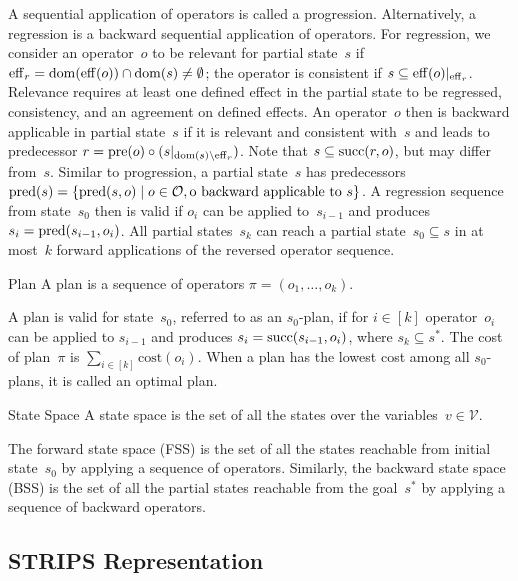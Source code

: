A sequential application of operators is called a progression. Alternatively, a regression is a backward sequential application of operators. For regression, we consider an operator~$o$ to be relevant for partial state~$s$ if $\operatorname{eff}_r=\operatorname{dom}(\operatorname{eff}(o))\cap\operatorname{dom}(s)\neq\emptyset$; the operator is consistent if $s \subseteq \operatorname{eff}(o)|_{\operatorname{eff}_r}$. Relevance requires at least one defined effect in the partial state to be regressed, consistency, and an agreement on defined effects. An operator~$o$ then is backward applicable in partial state~$s$ if it is relevant and consistent with~$s$ and leads to predecessor $r=\operatorname{pre}(o)\circ (s|_{\operatorname{dom}(s)\setminus\operatorname{eff}_r})$. Note that $s \subseteq \operatorname{succ}(r,o)$, but may differ from~$s$. Similar to progression, a partial state~$s$ has predecessors $\operatorname{pred}(s)=\{\operatorname{pred}(s,o)\mid o\in \mathcal{O}, \text{o backward applicable to }s\}$. A regression sequence from state~$s_0$ then is valid if $o_i$ can be applied to~$s_{i-1}$ and produces~$s_i=\operatorname{pred}(s_{i-1},o_i)$. All partial states~$s_k$ can reach a partial state~$s_0 \subseteq s$ in at most~$k$ forward applications of the reversed operator sequence.

\begin{definition}{Plan}
    \label{def:plan}
    A plan is a sequence of operators $\pi=(o_1,\ldots,o_k)$.
\end{definition}

A plan is valid for state~$s_0$, referred to as an $s_0$-plan, if for $i\in[k]$ operator~$o_i$ can be applied to $s_{i-1}$ and produces $s_i=\operatorname{succ}(s_{i-1},o_i)$, where $s_k \subseteq s^*$. The cost of plan~$\pi$ is $\sum_{i\in[k]} \text{cost}(o_i)$. When a plan has the lowest cost among all $s_0$-plans, it is called an optimal plan.

\begin{definition}{State Space}
    \label{def:statespace}
    A state space is the set of all the states over the variables~$v \in \mathcal{V}$.
\end{definition}

The forward state space (FSS) is the set of all the states reachable from initial state~$s_0$ by applying a sequence of operators. Similarly, the backward state space (BSS) is the set of all the partial states reachable from the goal~$s^*$ by applying a sequence of backward operators.

\subsection{STRIPS Representation}
\label{sec:strips}


